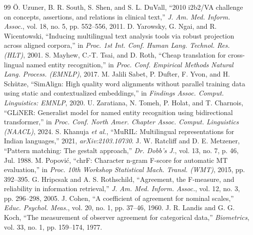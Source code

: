 \documentclass[conference]{IEEEtran}
\begin{document}
\begin{thebibliography}{99}
 Ö. Uzuner, B. R. South, S. Shen, and S. L. DuVall, “2010 i2b2/VA challenge on concepts, assertions, and relations in clinical text,” \emph{J. Am. Med. Inform. Assoc.}, vol. 18, no. 5, pp. 552–556, 2011.
 D. Yarowsky, G. Ngai, and R. Wicentowski, “Inducing multilingual text analysis tools via robust projection across aligned corpora,” in \emph{Proc. 1st Int. Conf. Human Lang. Technol. Res. (HLT)}, 2001.
 S. Mayhew, C.-T. Tsai, and D. Roth, “Cheap translation for cross-lingual named entity recognition,” in \emph{Proc. Conf. Empirical Methods Natural Lang. Process. (EMNLP)}, 2017.
 M. Jalili Sabet, P. Dufter, F. Yvon, and H. Schütze, “SimAlign: High quality word alignments without parallel training data using static and contextualized embeddings,” in \emph{Findings Assoc. Comput. Linguistics: EMNLP}, 2020.
 U. Zaratiana, N. Tomeh, P. Holat, and T. Charnois, “GLiNER: Generalist model for named entity recognition using bidirectional transformer,” in \emph{Proc. Conf. North Amer. Chapter Assoc. Comput. Linguistics (NAACL)}, 2024.
 S. Khanuja \emph{et al.}, “MuRIL: Multilingual representations for Indian languages,” 2021, \emph{arXiv:2103.10730}.
 J. W. Ratcliff and D. E. Metzener, “Pattern matching: The gestalt approach,” \emph{Dr. Dobb’s J.}, vol. 13, no. 7, p. 46, Jul. 1988.
 M. Popović, “chrF: Character n-gram F-score for automatic MT evaluation,” in \emph{Proc. 10th Workshop Statistical Mach. Transl. (WMT)}, 2015, pp. 392–395.
 G. Hripcsak and A. S. Rothschild, “Agreement, the F-measure, and reliability in information retrieval,” \emph{J. Am. Med. Inform. Assoc.}, vol. 12, no. 3, pp. 296–298, 2005.
 J. Cohen, “A coefficient of agreement for nominal scales,” \emph{Educ. Psychol. Meas.}, vol. 20, no. 1, pp. 37–46, 1960.
 J. R. Landis and G. G. Koch, “The measurement of observer agreement for categorical data,” \emph{Biometrics}, vol. 33, no. 1, pp. 159–174, 1977.
\end{thebibliography}
\end{document}
